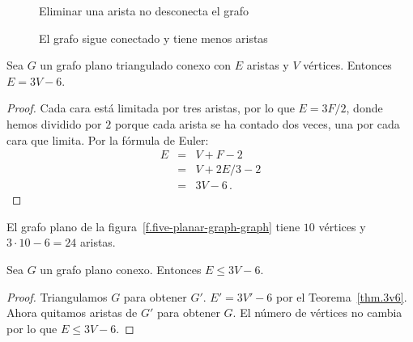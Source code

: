 \begin{figure}[b]
\begin{minipage}{.45\textwidth}
\begin{center}
\caption{Eliminar una arista no desconecta el grafo}\label{f.five-connected-remains}
\end{center}
\end{minipage}
\hfill
\begin{minipage}{.45\textwidth}
\begin{center}
\caption{El grafo sigue conectado y tiene menos aristas}\label{f.five-connected-fewer}
\end{center}
\end{minipage}
\end{figure}

\begin{theorem}\label{thm.3v6}
Sea $G$ un grafo plano triangulado conexo con $E$ aristas y $V$ vértices. Entonces $E= 3V-6$.
\end{theorem}
\begin{proof}
Cada cara está limitada por tres aristas, por lo que $E=3F/2$, donde hemos dividido por $2$ porque cada arista se ha contado dos veces, una por cada cara que limita. Por la fórmula de Euler:
\begin{eqnarray*}
E&=&V+F-2\\
&=&V+2E/3-2\\
&=&3V-6\,.
\end{eqnarray*}
\end{proof}

\begin{example}
El grafo plano de la figura~\ref{f.five-planar-graph-graph} tiene $10$ vértices y $3\cdot 10-6=24$ aristas.
\end{example}

\begin{theorem}\label{thm.count}
Sea $G$ un grafo plano conexo. Entonces $E\leq 3V-6$.
\end{theorem}

\begin{proof}
Triangulamos $G$ para obtener $G'$. $E'= 3V'-6$ por el Teorema~\ref{thm.3v6}. Ahora quitamos aristas de $G'$ para obtener $G$. El número de vértices no cambia por lo que $E\leq 3V-6$.
\end{proof}

